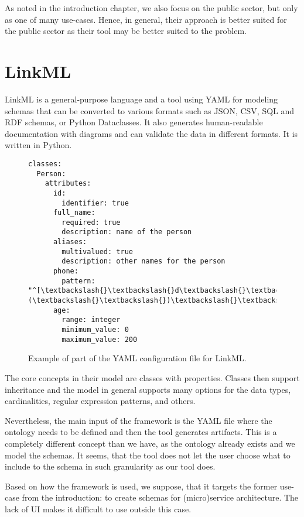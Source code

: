 As noted in the introduction chapter, we also focus on the public sector, but only as one of many use-cases. Hence, in general, their approach is better suited for the public sector as their tool may be better suited to the problem.

\section{LinkML}

LinkML is a general-purpose language and a tool using YAML for modeling schemas that can be converted to various formats such as JSON, CSV, SQL and RDF schemas, or Python Dataclasses. It also generates human-readable documentation with diagrams and can validate the data in different formats. It is written in Python.

\begin{figure}[h!]\centering
    \begin{Verbatim}[commandchars=\\\{\}]
classes:
  Person:
    attributes:
      id:
        identifier: true
      full_name:
        required: true
        description: name of the person
      aliases:
        multivalued: true
        description: other names for the person
      phone:
        pattern: "^[\textbackslash{}\textbackslash{}d\textbackslash{}\textbackslash{}(\textbackslash{}\textbackslash{})\textbackslash{}\textbackslash{}-]+$"
      age:
        range: integer
        minimum_value: 0
        maximum_value: 200
    \end{Verbatim}
    \caption{Example of part of the YAML configuration file for LinkML.}
\end{figure}

The core concepts in their model are classes with properties. Classes then support inheritance and the model in general supports many options for the data types, cardinalities, regular expression patterns, and others.

Nevertheless, the main input of the framework is the YAML file where the ontology needs to be defined and then the tool generates artifacts. This is a completely different concept than we have, as the ontology already exists and we model the schemas. It seems, that the tool does not let the user choose what to include to the schema in such granularity as our tool does.

Based on how the framework is used, we suppose, that it targets the former use-case from the introduction: to create schemas for (micro)service architecture. The lack of UI makes it difficult to use outside this case.

